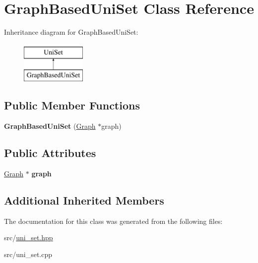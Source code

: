 \hypertarget{classGraphBasedUniSet}{\section{Graph\-Based\-Uni\-Set Class Reference}
\label{classGraphBasedUniSet}
}
Inheritance diagram for Graph\-Based\-Uni\-Set\-:\begin{figure}[H]
\begin{center}
\leavevmode
\includegraphics[height=2.000000cm]{classGraphBasedUniSet}
\end{center}
\end{figure}
\subsection*{Public Member Functions}
\begin{DoxyCompactItemize}
\item 
\hypertarget{classGraphBasedUniSet_a5e38d30d91679e97038e6fa34bd54bea}{{\bfseries Graph\-Based\-Uni\-Set} (\hyperlink{classGraph}{Graph} $\ast$graph)}\label{classGraphBasedUniSet_a5e38d30d91679e97038e6fa34bd54bea}

\end{DoxyCompactItemize}
\subsection*{Public Attributes}
\begin{DoxyCompactItemize}
\item 
\hypertarget{classGraphBasedUniSet_a0d92dfbe2e0832dc635267283a4f525e}{\hyperlink{classGraph}{Graph} $\ast$ {\bfseries graph}}\label{classGraphBasedUniSet_a0d92dfbe2e0832dc635267283a4f525e}

\end{DoxyCompactItemize}
\subsection*{Additional Inherited Members}


The documentation for this class was generated from the following files\-:\begin{DoxyCompactItemize}
\item 
src/\hyperlink{uni__set_8hpp}{uni\-\_\-set.\-hpp}\item 
src/uni\-\_\-set.\-cpp\end{DoxyCompactItemize}
